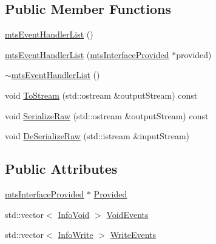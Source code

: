 \subsection*{Public Member Functions}
\begin{DoxyCompactItemize}
\item 
\hyperlink{classmts_event_handler_list_ad8252a65bae0b9e59c5051fcf0ffd5b0}{mts\-Event\-Handler\-List} ()
\item 
\hyperlink{classmts_event_handler_list_a30bb6895d7e72e2e9ff372064fcd88ba}{mts\-Event\-Handler\-List} (\hyperlink{classmts_interface_provided}{mts\-Interface\-Provided} $\ast$provided)
\item 
\hyperlink{classmts_event_handler_list_a824c64336b63056f32734fe0ad651323}{$\sim$mts\-Event\-Handler\-List} ()
\item 
void \hyperlink{classmts_event_handler_list_aeb24dcca4345b9b2dc1f3fdf89e85b8a}{To\-Stream} (std\-::ostream \&output\-Stream) const 
\item 
void \hyperlink{classmts_event_handler_list_ae7391045273ca992ba780946a0721246}{Serialize\-Raw} (std\-::ostream \&output\-Stream) const 
\item 
void \hyperlink{classmts_event_handler_list_ab54135f1691b0ea947d18e50b5e69738}{De\-Serialize\-Raw} (std\-::istream \&input\-Stream)
\end{DoxyCompactItemize}
\subsection*{Public Attributes}
\begin{DoxyCompactItemize}
\item 
\hyperlink{classmts_interface_provided}{mts\-Interface\-Provided} $\ast$ \hyperlink{classmts_event_handler_list_a9e99be005cdcdb3ecfbb5bc2f3d79edb}{Provided}
\item 
std\-::vector$<$ \hyperlink{classmts_event_handler_list_a7b977bcaba00a2616c48b250d02d53d5}{Info\-Void} $>$ \hyperlink{classmts_event_handler_list_a8ef4db8408648d0cb17035158a483ad9}{Void\-Events}
\item 
std\-::vector$<$ \hyperlink{classmts_event_handler_list_ac4f93c3df99ddcff2ecc44e52f76ffc8}{Info\-Write} $>$ \hyperlink{classmts_event_handler_list_a81ec4eb1a15604dc9e2b0b88ff7c21a0}{Write\-Events}
\end{DoxyCompactItemize}


